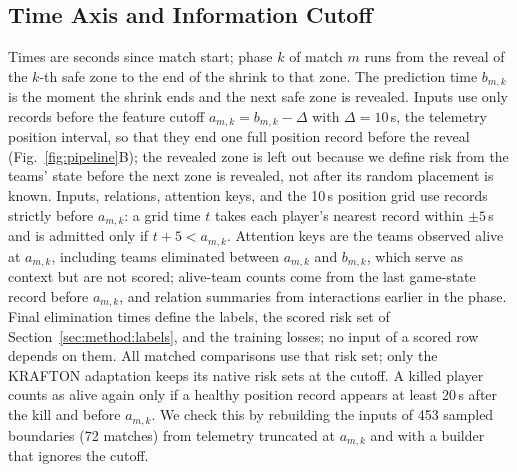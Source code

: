 \documentclass[sigconf,anonymous]{acmart}
\begin{document}
\subsection{Time Axis and Information Cutoff}
\label{sec:method:samples}
Times are seconds since match start; phase $k$ of match $m$ runs from the reveal of the $k$-th safe zone to the end of the shrink to that zone. The prediction time $b_{m,k}$ is the moment the shrink ends and the next safe zone is revealed. Inputs use only records before the feature cutoff $a_{m,k}=b_{m,k}-\Delta$ with $\Delta=10$\,s, the telemetry position interval, so that they end one full position record before the reveal (Fig.~\ref{fig:pipeline}B); the revealed zone is left out because we define risk from the teams' state before the next zone is revealed, not after its random placement is known. Inputs, relations, attention keys, and the 10\,s position grid use records strictly before $a_{m,k}$: a grid time $t$ takes each player's nearest record within $\pm5$\,s and is admitted only if $t+5<a_{m,k}$. Attention keys are the teams observed alive at $a_{m,k}$, including teams eliminated between $a_{m,k}$ and $b_{m,k}$, which serve as context but are not scored; alive-team counts come from the last game-state record before $a_{m,k}$, and relation summaries from interactions earlier in the phase. Final elimination times define the labels, the scored risk set of Section~\ref{sec:method:labels}, and the training losses; no input of a scored row depends on them. All matched comparisons use that risk set; only the KRAFTON adaptation keeps its native risk sets at the cutoff. A killed player counts as alive again only if a healthy position record appears at least 20\,s after the kill and before $a_{m,k}$. We check this by rebuilding the inputs of 453 sampled boundaries (72 matches) from telemetry truncated at $a_{m,k}$ and with a builder that ignores the cutoff.
\end{document}
